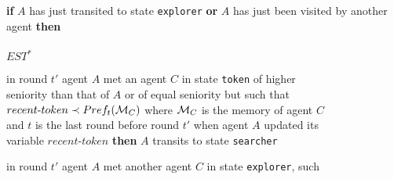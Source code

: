 \documentclass[11pt]{article}
\newcommand{\cM}{{\cal M}}
\begin{document}
  \vspace*{0.2cm} 
  \noindent
  \hspace*{0.5cm} {\bf if} $A$ has just transited to state {\tt explorer} {\bf or} $A$ has just been visited by another agent {\bf then}\\
   \noindent
  \hspace*{1cm}{\bf do}\\
   \noindent
 \hspace*{1.5cm}$EST^*$
 
  \vspace*{0.2cm}
  \noindent
  \hspace*{1.5cm}{\bf if} {in round $t'$} agent $A$ met an agent $C$ in state {\tt token} of higher\\ 
   \noindent
  \hspace*{1.5cm}seniority than that of $A$ or of equal seniority but 
   such that\\
   \noindent
   \hspace*{1.5cm}$recent\mbox{-}token\prec Pref_t( \cM_C)$ where $\cM_C$ is the memory of agent $C$\\
    \noindent
    \hspace*{1.5cm}and $t$ is the last
   round before round $t'$ when agent $A$ updated its \\
    \noindent
    \hspace*{1.5cm}variable $recent$-$token$ {\bf then} $A$ transits to state {\tt searcher}
    
     \vspace*{0.2cm}
     \noindent
     \hspace*{1.5cm}{\bf if} {in round $t'$ agent} $A$ met another agent $C$ in state {\tt explorer}, such\\ 
      \noindent
    \hspace*{1.5cm}{that either the seniority of $C$ is higher
     than that of $A$, or these}\\ 
      \noindent
      \\ 
       \noindent
      \hspace*{1.5cm}{where $R_A$ (resp. $R_C$) is the value of the variable $recent$-$token$ of $A$}\\ 
      \noindent
      \hspace*{1.5cm}{(resp. $C$) at the time of the meeting and $t_A$ (resp. $t_C$) is the}\\
 \noindent
      \hspace*{1.5cm}{last round before $t'$ when agent $A$ (resp. $C$)}\\
 \noindent
    
\end{document}
